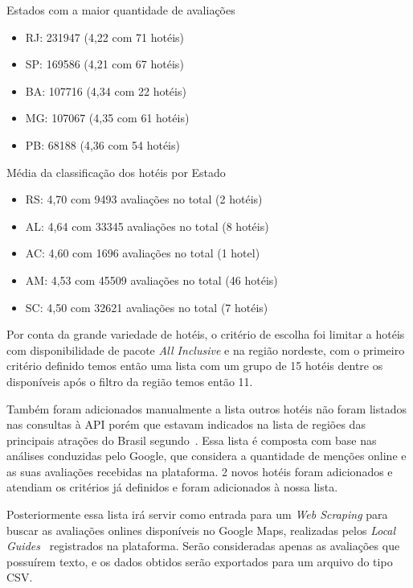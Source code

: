 Estados com a maior quantidade de avaliações

\begin{itemize}
	\item RJ: 231947 (4,22 com 71 hotéis)
	\item SP: 169586 (4,21 com 67 hotéis)
	\item BA: 107716 (4,34 com 22 hotéis)
	\item MG: 107067 (4,35 com 61 hotéis)
	\item PB: 68188 (4,36 com 54 hotéis)
\end{itemize}


Média da classificação dos hotéis por Estado

\begin{itemize}
	\item RS: 4,70 com 9493 avaliações no total (2 hotéis)
	\item AL: 4,64 com 33345 avaliações no total (8 hotéis)
	\item AC: 4,60 com 1696 avaliações no total (1 hotel)
	\item AM: 4,53 com 45509 avaliações no total (46 hotéis)
	\item SC: 4,50 com 32621 avaliações no total (7 hotéis)
\end{itemize}

Por conta da grande variedade de hotéis, o critério de escolha foi limitar a hotéis com disponibilidade de pacote \emph{All Inclusive} e na região nordeste, com o primeiro critério definido temos então uma lista com um grupo de 15 hotéis dentre os disponíveis após o filtro da região temos então 11.

Também foram adicionados manualmente a lista outros hotéis não foram listados nas consultas à API porém que estavam indicados na lista de regiões das principais atrações do Brasil segundo~\cite{googleFlights2022destinos}. Essa lista é composta com base nas análises conduzidas pelo Google, que considera a quantidade de menções online e as suas avaliações recebidas na plataforma. 2 novos hotéis foram adicionados e atendiam os critérios já definidos e foram adicionados à nossa lista.

Posteriormente essa lista irá servir como entrada para um \emph{Web Scraping} para buscar as avaliações onlines disponíveis no Google Maps, realizadas pelos \emph{Local Guides}~\cite{google2022localguides} registrados na plataforma. Serão consideradas apenas as avaliações que possuírem texto, e os dados obtidos serão exportados para um arquivo do tipo CSV.

